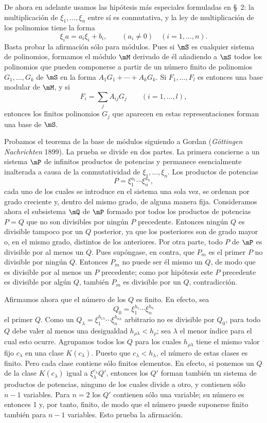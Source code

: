 \documentclass[11pt]{article}
\begin{document}
De ahora en adelante usamos las hipótesis más especiales formuladas en \S~2: la multiplicación de $\xi_1,\ldots,\xi_n$ entre sí es conmutativa, y la ley de multiplicación de los polinomios tiene la forma
\begin{equation}
 \xi_i a=a_i\xi_i+b_i,
 \qquad (a_i\ne0)\quad(i=1,\ldots,n).
\tag{6}
\end{equation}
Basta probar la afirmación sólo para módulos. Pues si $\mS$ es cualquier sistema de polinomios, formamos el módulo $\mM$ derivado de él añadiendo a $\mS$ todos los polinomios que pueden componerse a partir de un número finito de polinomios $G_1,\ldots,G_k$ de $\mS$ en la forma $A_1G_1+\cdots+A_kG_k$. Si $F_1,\ldots,F_l$ es entonces una base modular de $\mM$, y si
\[
 F_i=\sum_j A_{ij}G_j\qquad(i=1,\ldots,l),
\]
entonces los finitos polinomios $G_j$ que aparecen en estas representaciones forman una base de $\mS$.

Probamos el teorema de la base de módulos siguiendo a Gordan (\emph{Göttingen Nachrichten} 1899). La prueba se divide en dos partes. La primera concierne a un sistema $\mP$ de infinitos productos de potencias y permanece esencialmente inalterada a causa de la conmutatividad de $\xi_1,\ldots,\xi_n$. Los productos de potencias
\[
 P=\xi_1^{a_1}\cdots\xi_n^{a_n},
\]
cada uno de los cuales se introduce en el sistema una sola vez, se ordenan por grado creciente y, dentro del mismo grado, de alguna manera fija. Consideramos ahora el subsistema $\mQ$ de $\mP$ formado por todos los productos de potencias $P=Q$ que no son divisibles por ningún $P$ precedente. Entonces ningún $Q$ es divisible tampoco por un $Q$ posterior, ya que los posteriores son de grado mayor o, en el mismo grado, distintos de los anteriores. Por otra parte, todo $P$ de $\mP$ es divisible por al menos un $Q$. Pues supóngase, en contra, que $P_m$ es el primer $P$ no divisible por ningún $Q$. Entonces $P_m$ no puede ser él mismo un $Q$, de modo que es divisible por al menos un $P$ precedente; como por hipótesis este $P$ precedente es divisible por algún $Q$, también $P_m$ es divisible por un $Q$, contradicción.

Afirmamos ahora que el número de los $Q$ es finito. En efecto, sea
\[
 Q_0=\xi_1^{h_1}\cdots\xi_n^{h_n}
\]
el primer $Q$. Como un $Q_\lambda=\xi_1^{h_{1\lambda}}\cdots\xi_n^{h_{n\lambda}}$ arbitrario no es divisible por $Q_0$, para todo $Q$ debe valer al menos una desigualdad $h_{\rho\lambda}<h_\rho$; sea $\lambda$ el menor índice para el cual esto ocurre. Agrupamos todos los $Q$ para los cuales $h_{\rho\lambda}$ tiene el mismo valor fijo $c_\lambda$ en una clase $K(c_\lambda)$. Puesto que $c_\lambda<h_\lambda$, el número de estas clases es finito. Pero cada clase contiene sólo finitos elementos. En efecto, si ponemos un $Q$ de la clase $K(c_\lambda)$ igual a $\xi_\lambda^{c_\lambda}Q'$, entonces los $Q'$ forman también un sistema de productos de potencias, ninguno de los cuales divide a otro, y contienen sólo $n-1$ variables. Para $n=2$ los $Q'$ contienen sólo una variable; su número es entonces 1 y, por tanto, finito, de modo que el número puede suponerse finito también para $n-1$ variables. Esto prueba la afirmación.
\end{document}
